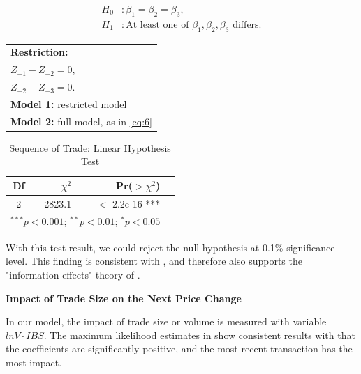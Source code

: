 \[
\begin{aligned}
H_0 &: \beta_1 = \beta_2 = \beta_3, \\
H_1 &: \text{At least one of } \beta_1, \beta_2, \beta_3 \text{ differs}.
\end{aligned}
\]
    \begin{tabular}{l}
        \textbf{Restriction:}\\
        $Z_{-1} - Z_{-2} = 0$,\\
        $Z_{-2} - Z_{-3} = 0$.\\
        \textbf{Model 1:} restricted model\\
        \textbf{Model 2:} full model, as in \eqref{eq:6}
    \end{tabular}
    
\begin{table}[htbp]
    \centering
    \vspace{0.5em}
    \begin{tabular}{crrl}
        \toprule
        Df & $\chi^2$ & Pr($>$$\chi^2$) \\
        \midrule
         2 & 2823.1 & $<$ 2.2e-16 *** \\ 
         \bottomrule
        \multicolumn{3}{l}{$^{***}p < 0.001$; $^{**}p < 0.01$; $^{*}p < 0.05$}
    \end{tabular}
        \caption{Sequence of Trade: Linear Hypothesis Test}
    \label{tab:table-8}
\end{table}

With this test result, we could reject the null hypothesis at 0.1\% significance level. This finding is consistent with \citet{hausman1992}, and therefore also supports the "information-effects" theory of \citet{easleyohara1987}.



{\noindent\bfseries Impact of Trade Size on the Next Price Change}

In our model, the impact of trade size or volume is measured with variable \(lnV\cdot IBS \). The maximum likelihood estimates in  show consistent results with \citet{hausman1992} that the coefficients are significantly positive, and the most recent transaction has the most impact. 

